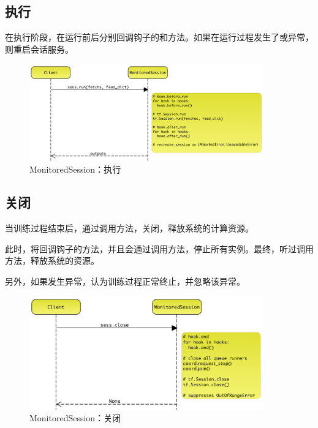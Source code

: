 \begin{content}
\subsection{执行}

在执行阶段，在运行前后分别回调钩子的和方法。如果在运行过程发生了或异常，则重启会话服务。

\begin{figure}[!htbp]
\centering
\includegraphics[width=0.9\textwidth]{figures/py-train-monitored-session-execution.png}
\caption{MonitoredSession：执行}
 \label{fig:py-train-monitored-session-execution}
\end{figure}

\subsection{关闭}

当训练过程结束后，通过调用方法，关闭，释放系统的计算资源。

此时，将回调钩子的方法，并且会通过调用方法，停止所有实例。最终，听过调用方法，释放系统的资源。

另外，如果发生异常，认为训练过程正常终止，并忽略该异常。

\begin{figure}[!htbp]
\centering
\includegraphics[width=0.9\textwidth]{figures/py-train-monitored-session-close.png}
\caption{MonitoredSession：关闭}
 \label{fig:py-train-monitored-session-close}
\end{figure}

\end{content}

